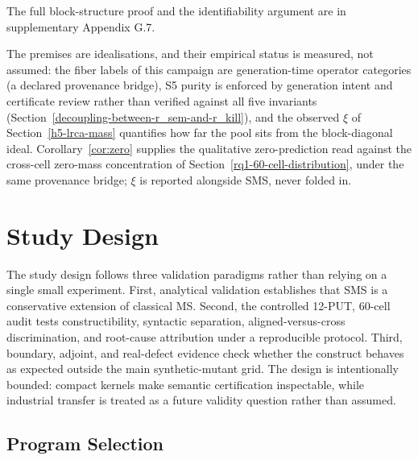\documentclass[review,12pt,authoryear]{elsarticle}
\begin{document}
The full block-structure proof and the identifiability argument are in
supplementary Appendix G.7.

The premises are idealisations, and their empirical status is measured,
not assumed: the fiber labels of this campaign are generation-time
operator categories (a declared provenance bridge), S5 purity is
enforced by generation intent and certificate review rather than
verified against all five invariants
(Section~\ref{decoupling-between-r_sem-and-r_kill}), and the observed
$\xi$ of Section~\ref{h5-lrca-mass} quantifies how far the pool sits
from the block-diagonal ideal. Corollary~\ref{cor:zero} supplies the
qualitative zero-prediction read against the cross-cell zero-mass
concentration of Section~\ref{rq1-60-cell-distribution}, under the same
provenance bridge; $\xi$ is reported alongside SMS, never folded in.


\section{Study Design}\label{experimental-subjects-and-operator-framework}

The study design follows three validation paradigms rather than relying
on a single small experiment. First, analytical validation establishes
that SMS is a conservative extension of classical MS. Second, the
controlled 12-PUT, 60-cell audit tests constructibility, syntactic
separation, aligned-versus-cross discrimination, and root-cause
attribution under a reproducible protocol. Third, boundary, adjoint, and
real-defect evidence check whether the construct behaves as expected
outside the main synthetic-mutant grid. The design is intentionally
bounded: compact kernels make semantic certification inspectable, while
industrial transfer is treated as a future validity question rather than
assumed.

\subsection{Program Selection}\label{put-selection-12-puts-4-classes}
\end{document}
